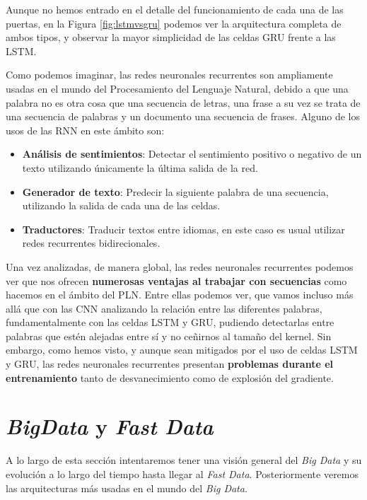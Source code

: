 Aunque no hemos entrado en el detalle del funcionamiento de cada una de las puertas, en la Figura \ref{fig:lstmvsgru} podemos ver la arquitectura completa de ambos tipos, y observar la mayor simplicidad de las celdas GRU frente a las LSTM. 


Como podemos imaginar, las redes neuronales recurrentes son ampliamente usadas en el mundo del Procesamiento del Lenguaje Natural, debido a que una palabra no es otra cosa que una secuencia de letras, una frase a su vez se trata de una secuencia de palabras y un documento una secuencia de frases. Alguno de los usos de las RNN en este ámbito son: 

\begin{itemize}
	\item \textbf{Análisis de sentimientos}: Detectar el sentimiento positivo o negativo de un texto utilizando únicamente la última salida de la red.
	\item \textbf{Generador de texto}: Predecir la siguiente palabra de una secuencia, utilizando la salida de cada una de las celdas. 
	\item \textbf{Traductores}: Traducir textos entre idiomas, en este caso es usual utilizar redes recurrentes bidirecionales.
\end{itemize}



Una vez analizadas, de manera global, las redes neuronales recurrentes podemos ver que nos ofrecen \textbf{numerosas ventajas al trabajar con secuencias} como hacemos en el ámbito del PLN. Entre ellas podemos ver, que vamos incluso más allá que con las CNN analizando la relación entre las diferentes palabras, fundamentalmente con las celdas LSTM y GRU, pudiendo detectarlas entre palabras que estén alejadas entre sí y no ceñirnos al tamaño del kernel. Sin embargo, como hemos visto, y aunque sean mitigados por el uso de celdas LSTM y GRU, las redes neuronales recurrentes presentan \textbf{problemas durante el entrenamiento} tanto de desvanecimiento como de explosión del gradiente.


\section{\textit{BigData} y \textit{Fast Data}}
\label{section:arte:big}
A lo largo de esta sección intentaremos tener una visión general del \textit{Big Data} y su evolución a lo largo del tiempo hasta llegar al \textit{Fast Data}. Posteriormente veremos las arquitecturas más usadas en el mundo del \textit{Big Data}. 

